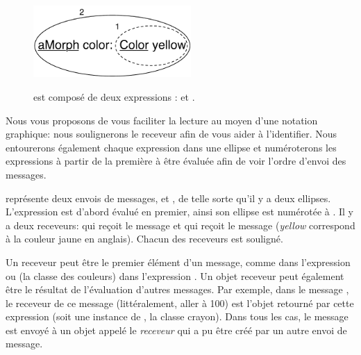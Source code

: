 \documentclass[a4paper,10pt,twoside]{book}
\begin{document}
\begin{figure}[htb]
\begin{minipage}{0.43\textwidth}
\begin{center}
		{\includegraphics[width=6cm]{uKeyUnOne}}
	\caption{ est compos\'e de deux expressions :  et .}
	\end{center}
\end{minipage}
\end{figure}



Nous vous proposons de vous faciliter la lecture au moyen d'une
notation graphique: nous soulignerons le receveur afin de vous aider
\`a l'identifier. Nous entourerons \'egalement chaque expression dans
une ellipse et num\'eroterons les expressions \`a partir de la
premi\`ere \`a \^etre \'evalu\'ee afin de voir l'ordre d'envoi des messages.


 repr\'esente deux envois de messages,  et , de telle sorte qu'il y a
deux ellipses. L'expression  est d'abord \'evalu\'e
en premier, ainsi son ellipse est num\'erot\'ee \`a . Il y a
deux receveurs:  qui re\c{c}oit le message 
et  qui re\c{c}oit le message  
(\emph{yellow} correspond \`a la couleur jaune en anglais). 
Chacun des receveurs est soulign\'e.

Un receveur peut \^etre le premier \'el\'ement d'un message, comme
 dans l'expression  ou  
(la classe des couleurs)
dans l'expression . Un objet receveur peut
\'egalement \^etre le r\'esultat de l'\'evaluation d'autres
messages. Par exemple, dans le message , le
receveur de ce message  
(litt\'eralement, aller \`a 100)
est l'objet retourn\'e par cette expression  
(soit une instance de , la classe crayon). Dans tous les cas,
le message est envoy\'e \`a un objet appel\'e le \emph{receveur} qui a
pu \^etre cr\'e\'e par un autre envoi de message.
\end{document}
